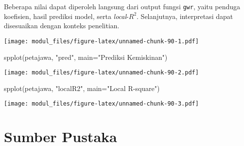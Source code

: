\documentclass[
]{book}
\newenvironment{Shaded}{\begin{snugshade}}{\end{snugshade}}
\newcommand{\AttributeTok}[1]{\textcolor[rgb]{0.77,0.63,0.00}{#1}}
\newcommand{\FunctionTok}[1]{\textcolor[rgb]{0.00,0.00,0.00}{#1}}
\newcommand{\NormalTok}[1]{#1}
\newcommand{\OtherTok}[1]{\textcolor[rgb]{0.56,0.35,0.01}{#1}}
\newcommand{\SpecialCharTok}[1]{\textcolor[rgb]{0.00,0.00,0.00}{#1}}
\newcommand{\StringTok}[1]{\textcolor[rgb]{0.31,0.60,0.02}{#1}}
\begin{document}
Beberapa nilai dapat diperoleh langsung dari output fungsi \texttt{gwr}, yaitu penduga koefisien, hasil prediksi model, serta \emph{local}-\(R^2\). Selanjutnya, interpretasi dapat disesuaikan dengan konteks penelitian.

\begin{Shaded}
\end{Shaded}

\texttt{[image: modul\_files/figure-latex/unnamed-chunk-90-1.pdf]}

\begin{Shaded}
\begin{Highlighting}[]
\FunctionTok{spplot}\NormalTok{(petajawa, }\StringTok{"pred"}\NormalTok{, }\AttributeTok{main=}\StringTok{"Prediksi Kemiskinan"}\NormalTok{)}
\end{Highlighting}
\end{Shaded}

\texttt{[image: modul\_files/figure-latex/unnamed-chunk-90-2.pdf]}

\begin{Shaded}
\begin{Highlighting}[]
\FunctionTok{spplot}\NormalTok{(petajawa, }\StringTok{"localR2"}\NormalTok{, }\AttributeTok{main=}\StringTok{"Local R{-}square"}\NormalTok{)}
\end{Highlighting}
\end{Shaded}

\texttt{[image: modul\_files/figure-latex/unnamed-chunk-90-3.pdf]}

\hypertarget{sumber-pustaka-2}{%
\section{Sumber Pustaka}\label{sumber-pustaka-2}}
\end{document}

